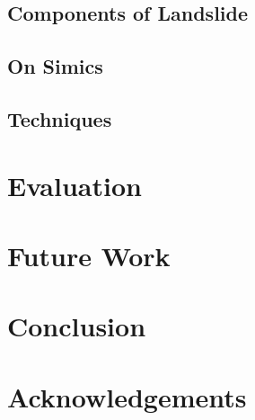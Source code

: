 \documentclass[twocolumn]{article}
\begin{document}
\subsection{Components of Landslide}

\subsection{On Simics}

\subsection{Techniques}


\section{Evaluation}

\section{Future Work}

\section{Conclusion}

\section{Acknowledgements}
\end{document}
